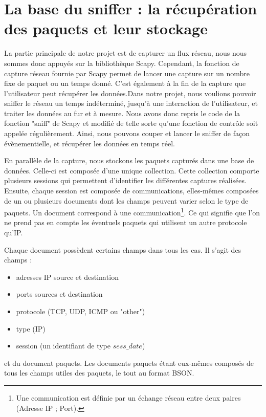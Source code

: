 \section{La base du sniffer : la récupération des paquets et leur stockage}

La partie principale de notre projet est de capturer un flux réseau, nous nous sommes donc appuyés sur la bibliothèque Scapy. Cependant, la fonction de capture
réseau fournie par Scapy permet de lancer une capture sur un nombre fixe de paquet ou un temps donné. C'est également à la fin de la capture que l'utilisateur peut récupérer les données.Dans notre projet, nous voulions pouvoir sniffer
le réseau un temps indéterminé, jusqu'à une interaction de l'utilisateur, et traiter les données au fur et à mesure. Nous avons donc repris le code de la fonction "sniff" de Scapy et modifié de telle sorte
qu'une fonction de contrôle soit appelée régulièrement. Ainsi, nous pouvons couper et lancer le sniffer de façon évènementielle, et récupérer les données en temps réel. 

En parallèle de la capture, nous stockons les paquets capturés dans une base de données. Celle-ci est composée d'une unique collection. Cette collection comporte plusieurs sessions qui permettent d'identifier les différentes captures réalisées. Ensuite, chaque session est composée de communications, elles-mêmes composées de un ou plusieurs documents dont les champs peuvent varier selon le type de paquets. Un document correspond à une communication\footnote{Une communication est définie par un échange réseau entre deux paires (Adresse IP ; Port).}. Ce qui signifie que l'on ne prend pas en compte les éventuels paquets qui utilisent un autre protocole qu'IP.

Chaque document possèdent certains champs dans tous les cas. Il s'agit des champs :
\begin{itemize}
\item adresses IP source et destination
\item ports sources et destination 
\item protocole (TCP, UDP, ICMP ou "other")
\item type (IP)
\item session (un identifiant de type $sess\_date$)
\end{itemize}

et du document paquets.
Les documents paquets étant eux-mêmes composés de tous les champs utiles des paquets, le tout au format BSON.


